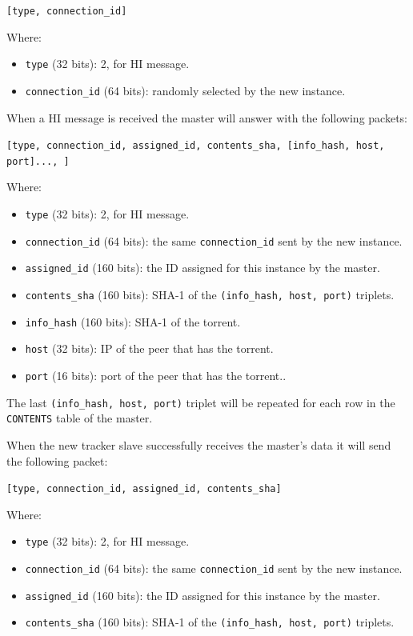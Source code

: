 \documentclass[twoside,a4paper,10pt]{article}
\begin{document}
\begin{itemize}
\begin{enumerate}
    \texttt{[type, connection\_id]}

    Where:
    \begin{itemize}
    \item \texttt{type} (32 bits): 2, for HI message.
    \item \texttt{connection\_id} (64 bits): randomly selected by the new
      instance.
    \end{itemize}

    When a HI message is received the master will answer with the following
    packets:

    \texttt{[type, connection\_id, assigned\_id, contents\_sha,
        [info\_hash, host, port]..., ]}

    Where:

    \begin{itemize}
    \item \texttt{type} (32 bits): 2, for HI message.
    \item \texttt{connection\_id} (64 bits): the same
      \texttt{connection\_id} sent by the new instance.
    \item \texttt{assigned\_id} (160 bits): the ID assigned for this instance
      by the master.
    \item \texttt{contents\_sha} (160 bits): SHA-1 of the
      \texttt{(info\_hash, host, port)} triplets.
    \item \texttt{info\_hash} (160 bits): SHA-1 of the torrent.
    \item \texttt{host} (32 bits): IP of the peer that has the torrent.
    \item \texttt{port} (16 bits): port of the peer that has the torrent..
    \end{itemize}

    The last \texttt{(info\_hash, host, port)} triplet will be repeated for each
    row in the \texttt{CONTENTS} table of the master.

    When the new tracker slave successfully receives the master's data it will
    send the following packet:

    \texttt{[type, connection\_id, assigned\_id, contents\_sha]}

    Where:

    \begin{itemize}
    \item \texttt{type} (32 bits): 2, for HI message.
    \item \texttt{connection\_id} (64 bits): the same
      \texttt{connection\_id} sent by the new instance.
    \item \texttt{assigned\_id} (160 bits): the ID assigned for this instance
      by the master.
    \item \texttt{contents\_sha} (160 bits): SHA-1 of the
      \texttt{(info\_hash, host, port)} triplets.
    \end{itemize}


\end{enumerate}
\end{itemize}
\end{document}
